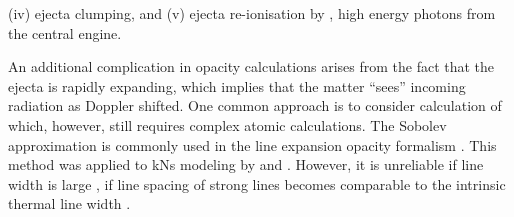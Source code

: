 (iv) ejecta clumping, 
and (v) ejecta re-ionisation by \eg, high energy photons from the central engine.


An additional complication in opacity calculations arises from the fact that the ejecta 
is rapidly expanding, which implies that the matter ``sees'' incoming radiation as 
Doppler shifted. 
One common approach is to consider  %
calculation of which, however, still requires complex atomic calculations.
%
The Sobolev approximation is commonly used in the line expansion opacity formalism 
\citep{Pinto:2000}.
This method was applied to \acp{kN} modeling by \citet{Barnes:2013wka} and \citet{Tanaka:2013ana}. 
However, it is unreliable if line width is large \ie, if line spacing of strong 
lines becomes comparable to the intrinsic thermal line width 
\citep{Kasen:2013xka,Fontes:2015,Fontes:2017zfb}. 


